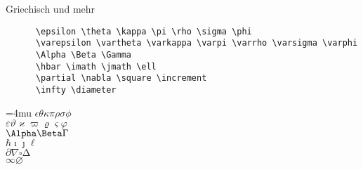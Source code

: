 \begin{frame}[fragile]{Griechisch und mehr}
  \begin{CodeExample}{0.72}
    \begin{verbatim}
      \epsilon \theta \kappa \pi \rho \sigma \phi
      \varepsilon \vartheta \varkappa \varpi \varrho \varsigma \varphi
      \Alpha \Beta \Gamma
      \hbar \imath \jmath \ell
      \partial \nabla \square \increment
      \infty \diameter
    \end{verbatim}
  \CodeResult
    \strut
    \Umathordordspacing\textstyle=4mu
    $\epsilon \theta \kappa \pi \rho \sigma \phi$ \\
    $\varepsilon \vartheta \varkappa \varpi \varrho \varsigma \varphi$ \\[\baselineskip]
    $\Alpha \Beta \Gamma$ \\
    $\hbar \imath \jmath \ell$ \\
    $\partial \nabla \square \increment$ \\
    $\infty \diameter$
  \end{CodeExample}
\end{frame}

